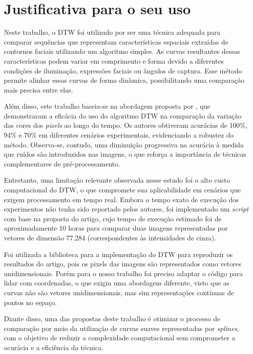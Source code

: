 \section{Justificativa para o seu uso}

Neste trabalho, o DTW foi utilizado por ser uma técnica adequada para comparar sequências que representam características espaciais extraídas de contornos faciais utilizando um algoritmo simples. As curvas resultantes dessas características podem variar em comprimento e forma devido a diferentes condições de iluminação, expressões faciais ou ângulos de captura. Esse método permite alinhar essas curvas de forma dinâmica, possibilitando uma comparação mais precisa entre elas.

Além disso, este trabalho baseia-se na abordagem proposta por \citet{DTW_LSTM}, que demonstraram a eficácia do uso do algoritmo DTW na comparação da variação das cores dos \textit{pixels} ao longo do tempo. Os autores obtiveram acurácias de 100\%, 94\% e 70\% em diferentes cenários experimentais, evidenciando a robustez do método. Observa-se, contudo, uma diminuição progressiva na acurácia à medida que ruídos são introduzidos nas imagens, o que reforça a importância de técnicas complementares de pré-processamento.


Entretanto, uma limitação relevante observada nesse estudo foi o alto custo computacional do DTW, o que compromete sua aplicabilidade em cenários que exigem processamento em tempo real. Embora o tempo exato de execução dos experimentos não tenha sido reportado pelos autores, foi implementado um \textit{script} com base na proposta do artigo, cujo tempo de execução estimado foi de aproximadamente 10 horas para comparar duas imagens representadas por vetores de dimensão 77.284 (correspondentes às intensidades de cinza). 

Foi utilizada a biblioteca \cite{libDTW} para a implementação do DTW para reproduzir os resultados do artigo, pois os pixels das imagens são representados como vetores unidimensionais. Porém para o nosso trabalho foi preciso adaptar o código para lidar com coordenadas, o que exigiu uma abordagem diferente, visto que as curvas não são vetores unidimensionais, mas sim representações contínuas de pontos no espaço.

Diante disso, uma das propostas deste trabalho é otimizar o processo de comparação por meio da utilização de curvas suaves representadas por \textit{splines}, com o objetivo de reduzir a complexidade computacional sem comprometer a acurácia e a eficiência da técnica.

